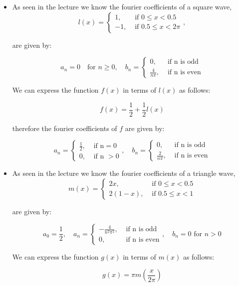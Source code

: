 \documentclass[11pt]{article}
\begin{document}
\begin{solution}     
    \begin{itemize}
    \item As seen in the lecture we know the fourier coefficients of a square wave,
    $$
    l(x)= \begin{cases}1, & \text { if } 0 \leq x<0.5 \\ -1, & \text { if } 0.5 \leq x<2 \pi\end{cases},
    $$

    are given by:

    $$
    a_n = 0\quad \text{for } n \geq 0, \quad b_n = \begin{cases}0, & \text { if n is odd} \\ \frac{4}{n\pi}, & \text{ if n is even}\end{cases}
    $$

    We can express the function $f(x)$ in terms of $l(x)$ as follows:

    $$
    f(x) = \frac{1}{2} + \frac{1}{2}l(x)
    $$

    therefore the fourier coefficients of $f$ are given by:

    $$
    a_n = \begin{cases}\frac{1}{2}, & \text { if n} = 0 \\0,& \text{ if n }>0\end{cases}, \quad b_n = \begin{cases}0, & \text { if n is odd} \\ \frac{2}{n\pi}, & \text{ if n is even}\end{cases}
    $$
    \item  As seen in the lecture we know the fourier coefficients of a triangle wave,
    $$
    m(x)= \begin{cases}2 x, & \text { if } 0 \leq x<0.5 \\ 2(1-x), & \text { if } 0.5 \leq x<1\end{cases}
    $$

    are given by:

    $$
    a_0 = \frac{1}{2}, \quad a_n = \begin{cases}-\frac{4}{n^2\pi^2}, & \text { if n is odd} \\ 0, & \text{ if n is even}\end{cases}, \quad b_n = 0 \text{ for } n > 0
    $$

    We can express the function $g(x)$ in terms of $m(x)$ as follows:

    $$
    g(x) = \pi m(\frac{x}{2\pi})
    $$


\end{itemize}
\end{solution}
\end{document}
